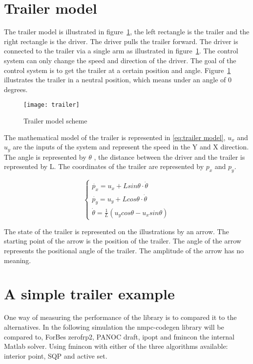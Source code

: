\section{Trailer model}
The trailer model is illustrated in figure~\ref{fig:trailer model}, the left rectangle is the trailer and the right rectangle is the driver. The driver pulls the trailer forward. The driver is connected to the trailer via a single arm as illustrated in figure~\ref{fig:trailer model}. The control system can only change the speed and direction of the driver. The goal of the control system is to get the trailer at a certain position and angle. Figure~\ref{fig:trailer model} illustrates the trailer in a neutral position, which means under an angle of 0 degrees.

\begin{figure}
	\centering
	\texttt{[image: trailer]}
	\caption{Trailer model scheme}
	\label{fig:trailer model}
\end{figure}

The mathematical model of the trailer is represented in \eqref{eq:trailer model}, $u_x$ and $u_y$ are the inputs of the system and represent the speed in the Y and X direction. The angle is represented by $\theta$ , the distance between the driver and the trailer is represented by L. The coordinates of the trailer are represented by $p_x$ and $p_y$.

\begin{equation}
	\begin{cases}
		\dot{p_x} = u_x + L sin \theta \cdot \dot{\theta} \\
		\dot{p_y} = u_y + L cos \theta \cdot \dot{\theta} \\
		\dot{\theta} = \frac{1}{L}(u_ycos \theta - u_x sin \theta)	
	\end{cases}
	\label{eq:trailer model}
\end{equation}

The state of the trailer is represented on the illustrations by an arrow. The starting point of the arrow is the position of the trailer. The angle of the arrow represents the positional angle of the trailer. The amplitude of the arrow has no meaning.

\section{A simple trailer example}
One way of measuring the performance of the library is to compared it to the alternatives. In the following simulation the nmpc-codegen library will be compared to, ForBes zerofrp2, PANOC draft, ipopt and fmincon the internal Matlab solver. Using fmincon with either of the three algorithms available: interior point, SQP and active set.

